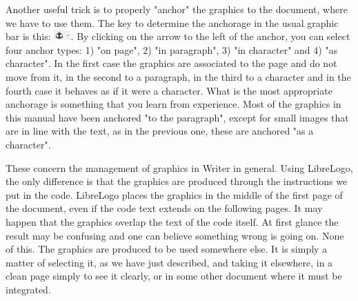 Another useful trick is to properly "anchor" the graphics to the document, where we have to use them. The key to determine the anchorage in the usual graphic bar is this: \includegraphics[height=1em]{./images/librelogo/AncoraLO.png}. By clicking on the arrow to the left of the anchor, you can select four anchor types: 1) "on page", 2) "in paragraph", 3) "in character" and 4) "as character". In the first case the graphics are associated to the page and do not move from it, in the second to a paragraph, in the third to a character and in the fourth case it behaves as if it were a character. What is the most appropriate anchorage is something that you learn from experience. Most of the graphics in this manual have been anchored "to the paragraph", except for small images that are in line with the text, as in the previous one, these are anchored "as a character".

These concern the management of graphics in Writer in general. Using LibreLogo, the only difference is that the graphics are produced through the instructions we put in the code. LibreLogo places the graphics in the middle of the first page of the document, even if the code text extends on the following pages. It may happen that the graphics overlap the text of the code itself. At first glance the result may be confusing and one can believe something wrong is going on. None of this. The graphics are produced to be used somewhere else. It is simply a matter of selecting it, as we have just described, and taking it elsewhere, in a clean page simply to see it clearly, or in some other document where it must be integrated.


